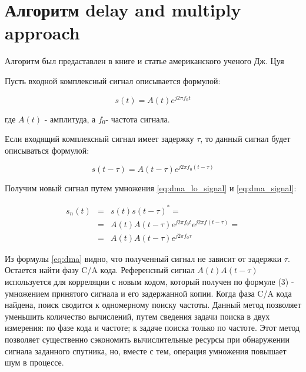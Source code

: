 \section{Алгоритм delay and multiply approach}

Алгоритм был предаставлен в книге и статье американского ученого Дж.
Цуя \cite{lin_dma, tsui}

Пусть входной комплексный сигнал описывается формулой:

\begin{center}
\begin{equation}
	s(t)=A(t)e^{j2{\pi}f_{0}t}\label{eq:dma_lo_signal}
\end{equation}
\end{center}

где $A(t)$ - амплитуда, а $f_{0}$- частота сигнала.

Если входящий комплексный сигнал имеет задержку $\tau$, то данный
сигнал будет описываться формулой: 

\begin{center}
\begin{equation}
	\label{eq:dma_signal}
	s(t-\tau)=A(t-\tau)e^{j2{\pi}f_{0}(t-\tau)}
\end{equation}
\end{center}

Получим новый сигнал путем умножения \ref{eq:dma_lo_signal} и \ref{eq:dma_signal}:

\begin{center}
\begin{eqnarray}
s_{n}(t) & = & s(t)s(t-\tau)^{*}=\nonumber \\
 & = & A(t)A(t-\tau)e^{j2\pi f_{0}t}e^{j2\pi f(t-\tau)}=\label{eq:dma}\\
 & = & A(t)A(t-\tau)e^{j2\pi f_{0}\tau}\nonumber 
\end{eqnarray}

\par\end{center}

Из формулы \ref{eq:dma} видно, что полученный сигнал не зависит от
задержки $\tau$. Остается найти фазу C/A кода. Референсный сигнал
$A(t)A(t-\tau)$ используется для корреляции с новым кодом, который
получен по формуле (3) - умножением принятого сигнала и его задержанной
копии. Когда фаза C/A кода найдена, поиск сводится к одномерному поиску
частоты. Данный метод позволяет уменьшить количество вычислений, путем
сведения задачи поиска в двух измерения: по фазе кода и частоте; к
задаче поиска только по частоте. Этот метод позволяет существенно
сэкономить вычислительные ресурсы при обнаружении сигнала заданного
спутника, но, вместе с тем, операция умножения повышает шум в процессе.

